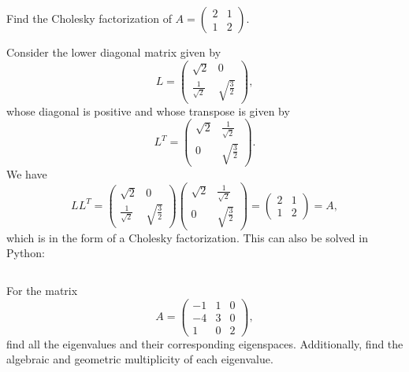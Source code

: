 \begin{problem}

\end{problem}
  Find the Cholesky factorization of
  \(A =
\begin{pmatrix}
    2 & 1\\
    1 & 2
  \end{pmatrix}
\).
\begin{solution}
  Consider the lower diagonal matrix given by
  \[
L =
  \begin{pmatrix}
    \sqrt{2} & 0\\
    \frac{1}{\sqrt{2}} & \sqrt{\frac{3}{2}}
  \end{pmatrix}
,
\]
  whose diagonal is positive and whose transpose is given by
  \[
L^{T} =
  \begin{pmatrix}
   \sqrt{2} & \frac{1}{\sqrt{2}}\\
   0 & \sqrt{\frac{3}{2}}
  \end{pmatrix}
.
\]
  We have
  \[
LL^{T} =
  \begin{pmatrix}
    \sqrt{2} & 0\\
    \frac{1}{\sqrt{2}} & \sqrt{\frac{3}{2}}
  \end{pmatrix}
  \begin{pmatrix}
   \sqrt{2} & \frac{1}{\sqrt{2}}\\
   0 & \sqrt{\frac{3}{2}}
  \end{pmatrix}
=
  \begin{pmatrix}
    2 & 1\\
    1 & 2
  \end{pmatrix}
=
  A,
\]
  which is in the form of a Cholesky factorization. This can also be solved in Python:
  \inputminted[frame = lines, bgcolor = lightgray, linenos]{python}{PythonSources/cholesky.py}
\end{solution}

\begin{problem}
  For the matrix
  \[
A =
  \begin{pmatrix}
   -1 & 1 & 0\\
   -4 & 3 & 0\\
   1 & 0 & 2
  \end{pmatrix}
,
\]
  find all the eigenvalues and their corresponding eigenspaces. Additionally, find the algebraic and geometric multiplicity of each eigenvalue.
\end{problem}


